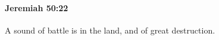 
		\paragraph{Jeremiah 50:22} %
			\label{JEREMIAH-50-22}

			A sound of battle is in the land, and of great destruction.


